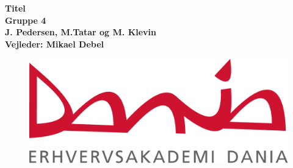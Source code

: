 \begin{titlepage}
   
   \begin{center}
   
      \Huge\textbf{Titel}
      \\
      \small\textbf{Gruppe 4}
      \\
      \Large\textbf{J. Pedersen, M.Tatar og M. Klevin}
      \\
      \small\textbf{Vejleder: Mikael Debel}
      	\begin{center}
		\begin{figure}
		\includegraphics[width=\linewidth]{Files/Front/dania.pdf}
		\end{figure}
       \end{center}   
   \end{center}
   \thispagestyle{empty}
\end{titlepage}